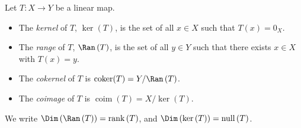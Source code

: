 \begin{definition}
  Let $T\colon X\rightarrow Y$ be a linear map.
  \begin{itemize}
    \item The \textit{kernel} of $T$, $\ker\left(T\right)$, is the set of all $x\in X$ such that $T(x) = 0_X$.
    \item The \textit{range} of $T$, $\Ran\left(T\right)$, is the set of all $y\in Y$ such that there exists $x\in X$ with $T(x) = y$.
    \item The \textit{cokernel} of $T$ is $\operatorname{coker}(T) = Y/\Ran\left(T\right)$.
    \item The \textit{coimage} of $T$ is $\operatorname{coim}\left(T\right) = X/\ker\left(T\right)$.
  \end{itemize}
  We write $\Dim\left(\Ran\left(T\right)\right) = \operatorname{rank}\left(T\right)$, and $\Dim\left(\ker\left(T\right)\right) = \operatorname{null}\left(T\right)$.
\end{definition}
%

